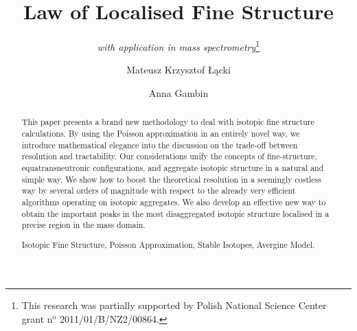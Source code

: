 \documentclass[runningheads,a4paper]{llncs}
\newcommand{\keywords}[1]{\par\addvspace\baselineskip
\noindent\keywordname\enspace\ignorespaces#1}
\begin{document}
\mainmatter  

\title{Law of Localised Fine Structure}

\subtitle{\textit{with application in mass spectrometry}\thanks{
	This research was partially supported by Polish National Science Center grant $\text{n}^\text{o}$ 2011/01/B/NZ2/00864.
}}



\author{Mateusz Krzysztof \L\k{a}cki
\and Anna Gambin}





\maketitle

\begin{abstract}
	This paper presents a brand new methodology to deal with isotopic fine structure calculations. By using the Poisson approximation in an entirely novel way, we introduce mathematical elegance into the discussion on the trade-off between resolution and tractability. Our considerations unify the concepts of fine-structure, equatransneutronic configurations, and aggregate isotopic structure in a natural and simple way. We show how to boost the theoretical resolution in a seemingly costless way by several orders of magnitude with respect to the already very efficient algorithms operating on isotopic aggregates. We also develop an effective new way to obtain the important peaks in the most disaggregated isotopic structure localised in a precise region in the mass domain.
\keywords{Isotopic Fine Structure, Poisson Approximation, Stable Isotopes, Avergine Model.}
\end{abstract}









  
  




\end{document}

